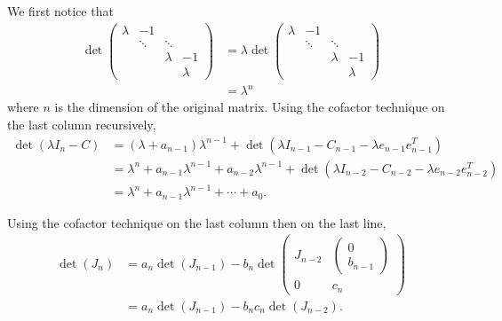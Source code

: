 \begin{solution}
  We first notice that
  \begin{align*}
    \det\begin{pmatrix}
      \lambda & -1 &\\
      & \ddots & \ddots\\
      & & \lambda & -1\\
      & & & \lambda
    \end{pmatrix}
    & =
    \lambda
    \det\begin{pmatrix}
      \lambda & -1 &\\
              & \ddots & \ddots\\
              & & \lambda & -1\\
              & & & \lambda
    \end{pmatrix}\\
    & = \lambda^n
  \end{align*}
  where $n$ is the dimension of the original matrix.
  Using the cofactor technique on the last column recursively,
  \begin{align*}
    \det(\lambda I_n - C) & = (\lambda + a_{n-1})\lambda^{n-1}
    + \det(\lambda I_{n-1} - C_{n-1} - \lambda e_{n-1}e_{n-1}^T)\\
    & =
    \lambda^n + a_{n-1}\lambda^{n-1}
    + a_{n-2} \lambda^{n-1}
    + \det(\lambda I_{n-2} - C_{n-2} - \lambda e_{n-2}e_{n-2}^T)\\
    & = \lambda^n + a_{n-1}\lambda^{n-1} + \cdots + a_0.
  \end{align*}
\end{solution}

\begin{solution}
  Using the cofactor technique on the last column then on the last line,
  \begin{align*}
    \det(J_n)
    & = a_n\det(J_{n-1}) - b_n
    \det
    \begin{pmatrix}
      J_{n-2} &
      \begin{pmatrix}
        0\\b_{n-1}
      \end{pmatrix}\\
      0 & c_n
    \end{pmatrix}\\
    & = a_n\det(J_{n-1}) - b_n c_n \det(J_{n-2}).
  \end{align*}
\end{solution}

